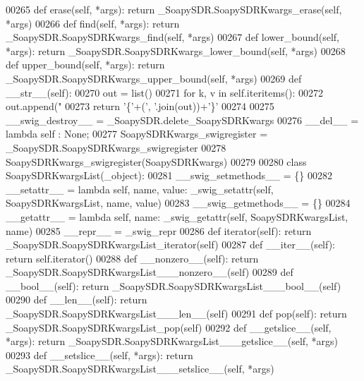 \begin{DoxyCode}
{{{00265     \textcolor{keyword}{def }erase(self, *args): \textcolor{keywordflow}{return} \_SoapySDR.SoapySDRKwargs\_erase(self, *args)
00266     \textcolor{keyword}{def }find(self, *args): \textcolor{keywordflow}{return} \_SoapySDR.SoapySDRKwargs\_find(self, *args)
00267     \textcolor{keyword}{def }lower_bound(self, *args): \textcolor{keywordflow}{return} \_SoapySDR.SoapySDRKwargs\_lower\_bound(self, *args)
00268     \textcolor{keyword}{def }upper_bound(self, *args): \textcolor{keywordflow}{return} \_SoapySDR.SoapySDRKwargs\_upper\_bound(self, *args)
00269     \textcolor{keyword}{def }__str__(self):
00270         out = list()
00271         \textcolor{keywordflow}{for} k, v \textcolor{keywordflow}{in} self.iteritems():
00272             out.append(\textcolor{stringliteral}{"%
00273         \textcolor{keywordflow}{return} \textcolor{stringliteral}{'\{'}+(\textcolor{stringliteral}{', '}.join(out))+\textcolor{stringliteral}{'\}'}
00274 
00275     \_\_swig\_destroy\_\_ = \_SoapySDR.delete\_SoapySDRKwargs
00276     \_\_del\_\_ = \textcolor{keyword}{lambda} self : \textcolor{keywordtype}{None};
00277 SoapySDRKwargs\_swigregister = \_SoapySDR.SoapySDRKwargs\_swigregister
00278 SoapySDRKwargs_swigregister(SoapySDRKwargs)
00279 
00280 \textcolor{keyword}{class }SoapySDRKwargsList(_object):
00281     \_\_swig\_setmethods\_\_ = \{\}
00282     \_\_setattr\_\_ = \textcolor{keyword}{lambda} self, name, value: _swig_setattr(self, SoapySDRKwargsList, name, value)
00283     \_\_swig\_getmethods\_\_ = \{\}
00284     \_\_getattr\_\_ = \textcolor{keyword}{lambda} self, name: _swig_getattr(self, SoapySDRKwargsList, name)
00285     \_\_repr\_\_ = \_swig\_repr
00286     \textcolor{keyword}{def }iterator(self): \textcolor{keywordflow}{return} \_SoapySDR.SoapySDRKwargsList\_iterator(self)
00287     \textcolor{keyword}{def }__iter__(self): \textcolor{keywordflow}{return} self.iterator()
00288     \textcolor{keyword}{def }__nonzero__(self): \textcolor{keywordflow}{return} \_SoapySDR.SoapySDRKwargsList\_\_\_nonzero\_\_(self)
00289     \textcolor{keyword}{def }__bool__(self): \textcolor{keywordflow}{return} \_SoapySDR.SoapySDRKwargsList\_\_\_bool\_\_(self)
00290     \textcolor{keyword}{def }__len__(self): \textcolor{keywordflow}{return} \_SoapySDR.SoapySDRKwargsList\_\_\_len\_\_(self)
00291     \textcolor{keyword}{def }pop(self): \textcolor{keywordflow}{return} \_SoapySDR.SoapySDRKwargsList\_pop(self)
00292     \textcolor{keyword}{def }__getslice__(self, *args): \textcolor{keywordflow}{return} \_SoapySDR.SoapySDRKwargsList\_\_\_getslice\_\_(self, *args)
00293     \textcolor{keyword}{def }__setslice__(self, *args): \textcolor{keywordflow}{return} \_SoapySDR.SoapySDRKwargsList\_\_\_setslice\_\_(self, *args)
}}}}
\end{DoxyCode}

